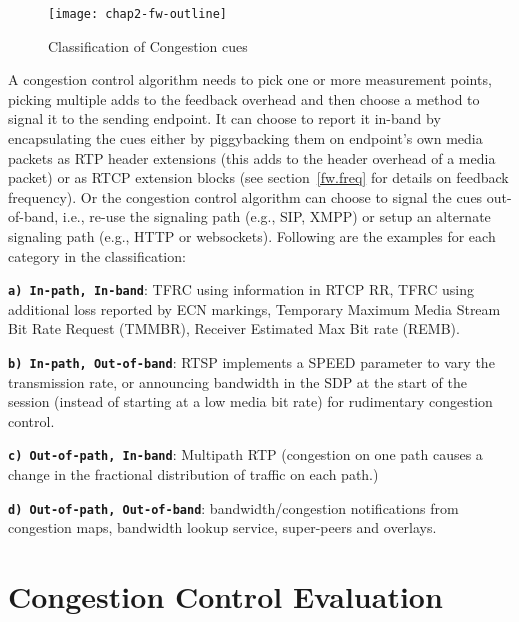 \begin{figure}[!h]
\texttt{[image: chap2-fw-outline]}
\caption{Classification of Congestion cues~\cite{Singh:PhDFw}}
\label{fig:4:fw}
\end{figure}

A congestion control algorithm needs to pick one or more measurement points,
picking multiple adds to the feedback overhead and then choose a method to
signal it to the sending endpoint. It can choose to report it in-band by
encapsulating the cues either by piggybacking them on endpoint's own media
packets as RTP header extensions (this adds to the header overhead of a media
packet) or as RTCP extension blocks (see section~\ref{fw.freq} for details on
feedback frequency). Or the congestion control algorithm can choose to signal
the cues out-of-band, i.e., re-use the signaling path (e.g., SIP, XMPP) or
setup an alternate signaling path (e.g., HTTP or websockets). Following are
the examples for each category in the classification:

\textbf{\texttt{a) In-path, In-band}}: TFRC using information in RTCP RR, TFRC
using additional loss reported by ECN markings, Temporary Maximum Media Stream
Bit Rate Request (TMMBR), Receiver Estimated Max Bit rate (REMB).

\textbf{\texttt{b) In-path, Out-of-band}}: RTSP implements a SPEED parameter
to vary the transmission rate, or announcing bandwidth in the SDP at the start
of the session (instead of starting at a low media bit rate) for rudimentary
congestion control.

\textbf{\texttt{c) Out-of-path, In-band}}: Multipath RTP (congestion on one
path causes a change in the fractional distribution of traffic on each path.)

\textbf{\texttt{d) Out-of-path, Out-of-band}}: bandwidth/congestion
notifications from congestion maps, bandwidth lookup service, super-peers and
overlays.




\section{Congestion Control Evaluation}
\label{fw.cc.eval}

